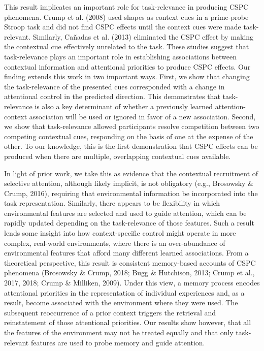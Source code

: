 \documentclass[english,,man,floatsintext]{apa6}
\begin{document}
This result implicates an important role for task-relevance in producing CSPC phenomena. Crump et al. (2008) used shapes as context cues in a prime-probe Stroop task and did not find CSPC effects until the context cues were made task-relevant. Similarly, Cañadas et al. (2013) eliminated the CSPC effect by making the contextual cue effectively unrelated to the task. These studies suggest that task-relevance plays an important role in establishing associations between contextual information and attentional priorities to produce CSPC effects. Our finding extends this work in two important ways. First, we show that changing the task-relevance of the presented cues corresponded with a change in attentional control in the predicted direction. This demonstrates that task-relevance is also a key determinant of whether a previously learned attention-context association will be used or ignored in favor of a new association. Second, we show that task-relevance allowed participants resolve competition between two competing contextual cues, responding on the basis of one at the expense of the other. To our knowledge, this is the first demonstration that CSPC effects can be produced when there are multiple, overlapping contextual cues available.

In light of prior work, we take this as evidence that the contextual recruitment of selective attention, although likely implicit, is not obligatory (e.g., Brosowsky \& Crump, 2016), requiring that environmental information be incorporated into the task representation. Similarly, there appears to be flexibility in which environmental features are selected and used to guide attention, which can be rapidly updated depending on the task-relevance of those features. Such a result lends some insight into how context-specific control might operate in more complex, real-world environments, where there is an over-abundance of environmental features that afford many different learned associations. From a theoretical perspective, this result is consistent memory-based accounts of CSPC phenomena (Brosowsky \& Crump, 2018; Bugg \& Hutchison, 2013; Crump et al., 2017, 2018; Crump \& Milliken, 2009). Under this view, a memory process encodes attentional priorities in the representation of individual experiences and, as a result, become associated with the environment where they were used. The subsequent reoccurrence of a prior context triggers the retrieval and reinstatement of those attentional priorities. Our results show however, that all the features of the environment may not be treated equally and that only task-relevant features are used to probe memory and guide attention.
\end{document}
